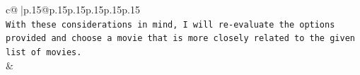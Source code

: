 \documentclass{article}
\begin{document}
{\begin{supertabular}{c@{$\;$}|p{.15\linewidth}@{}p{.15\linewidth}p{.15\linewidth}p{.15\linewidth}p{.15\linewidth}p{.15\linewidth}}
{{{\\ 
\texttt{With these considerations in mind, I will re{-}evaluate the options provided and choose a movie that is more closely related to the given list of movies.} \\
            }
        }
    }
    & \\ \\

\end{supertabular}
}
\end{document}

